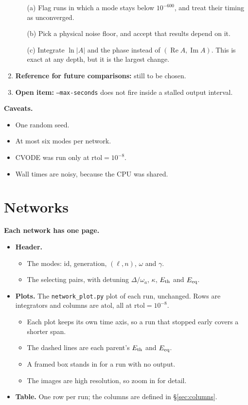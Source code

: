 \documentclass[10pt,a4paper]{article}
\newcommand{\atol}{\mathrm{atol}}
\newcommand{\rtol}{\mathrm{rtol}}
\newcommand{\Eth}{E_{\rm th}}
\newcommand{\Eeq}{E_{\rm eq}}
\begin{document}
\begin{enumerate}
        \begin{enumerate}
            \item[(a)] Flag runs in which a mode stays below $10^{-600}$, and treat their timing as unconverged.
            \item[(b)] Pick a physical noise floor, and accept that results depend on it.
            \item[(c)] Integrate $\ln|A|$ and the phase instead of $(\operatorname{Re}A,\operatorname{Im}A)$. This is exact at any depth, but it is the largest change.
        \end{enumerate}
    \item \textbf{Reference for future comparisons:} still to be chosen.
    \item \textbf{Open item:} \texttt{--max-seconds} does not fire inside a stalled output interval.
\end{enumerate}

\textbf{Caveats.}
\begin{itemize}
    \item One random seed.
    \item At most six modes per network.
    \item CVODE was run only at $\rtol=10^{-8}$.
    \item Wall times are noisy, because the CPU was shared.
\end{itemize}

\section{Networks}
\textbf{Each network has one page.}
\begin{itemize}
    \item \textbf{Header.}
        \begin{itemize}
            \item The modes: id, generation, $(\ell,n)$, $\omega$ and $\gamma$.
            \item The selecting pairs, with detuning $\Delta/\omega_a$, $\kappa$, $\Eth$ and $\Eeq$.
        \end{itemize}
    \item \textbf{Plots.} The \texttt{network\_plot.py} plot of each run, unchanged. Rows are integrators and columns are $\atol$, all at $\rtol=10^{-8}$.
        \begin{itemize}
            \item Each plot keeps its own time axis, so a run that stopped early covers a shorter span.
            \item The dashed lines are each parent's $\Eth$ and $\Eeq$.
            \item A framed box stands in for a run with no output.
            \item The images are high resolution, so zoom in for detail.
        \end{itemize}
    \item \textbf{Table.} One row per run; the columns are defined in \S\ref{sec:columns}.
\end{itemize}
\end{document}
